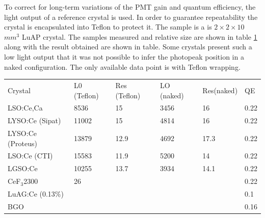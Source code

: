 To correct for long-term variations of the PMT gain and quantum efficiency, the light output of a reference crystal is used. In order to guarantee repeatability the crystal is encapsulated into Teflon to protect it. The sample is a is $2\times 2\times 10$ $mm^{3}$ LuAP crystal.
The samples measured and relative size are shown in table \ref{table:LYtable} along with the result obtained are shown in table. Some crystals present such a low light output that it was not possible to infer the photopeak position in a naked configuration. The only available data point is with Teflon wrapping.
\begin{table}[h]
\begin{center}
\begin{tabular}{llllll}
Crystal  & L0 (Teflon) & Res (Teflon) & LO (naked) &  Res(naked) & QE\\
LSO:Ce,Ca& 8536&15 & 3456&16 &0.22\\
LYSO:Ce (Sipat)&11002 &15 &4814 &16&0.22\\
LYSO:Ce (Proteus)& 13879& 12.9 & 4692& 17.3&0.22\\
LSO:Ce (CTI)&15583 &11.9 &5200 &14&0.22\\
LGSO:Ce & 10255&13.7 &3934 &14.1&0.22\\
CeF$_{3}$2300&26 & & & &0.22\\
LuAG:Ce (0.13$\%$)& & & & &0.1\\
BGO& & & & &0.16
\end{tabular}
\end{center}
\label{table:LYtable}
\end{table}

